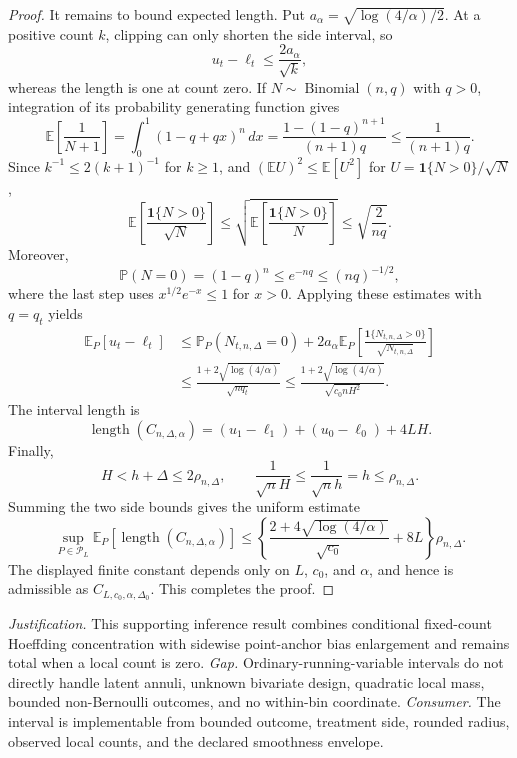 \documentclass{article}
\begin{document}
\begin{proof}
It remains to bound expected length.  Put \(a_\alpha=\sqrt{\log(4/\alpha)/2}\).  At a positive count \(k\), clipping can only shorten the side interval, so
\[
 u_t-\ell_t\leq\frac{2a_\alpha}{\sqrt{k}},
\]
whereas the length is one at count zero.  If \(N\sim\operatorname{Binomial}(n,q)\) with \(q>0\), integration of its probability generating function gives
\[
 \mathbb E\!\left[\frac1{N+1}\right]
 =\int_0^1(1-q+qx)^n\,dx
 =\frac{1-(1-q)^{n+1}}{(n+1)q}
 \leq\frac1{(n+1)q}.
\]
Since \(k^{-1}\leq2(k+1)^{-1}\) for \(k\geq1\), and \((\mathbb E U)^2\leq\mathbb E[U^2]\) for \(U=\mathbf1\{N>0\}/\sqrt N\),
\[
 \mathbb E\!\left[\frac{\mathbf1\{N>0\}}{\sqrt N}\right]
 \leq\sqrt{\mathbb E\!\left[\frac{\mathbf1\{N>0\}}N\right]}
 \leq\sqrt{\frac2{nq}}.
\]
Moreover,
\[
 \mathbb P(N=0)=(1-q)^n\leq e^{-nq}\leq(nq)^{-1/2},
\]
where the last step uses \(x^{1/2}e^{-x}\leq1\) for \(x>0\).  Applying these estimates with \(q=q_t\) yields
\[
 \begin{aligned}
 \mathbb E_P[u_t-\ell_t]
 &\leq \mathbb P_P(N_{t,n,\Delta}=0)
   +2a_\alpha\mathbb E_P\!\left[
      \frac{\mathbf1\{N_{t,n,\Delta}>0\}}{\sqrt{N_{t,n,\Delta}}}
    \right]\\
 &\leq\frac{1+2\sqrt{\log(4/\alpha)}}{\sqrt{nq_t}}
 \leq\frac{1+2\sqrt{\log(4/\alpha)}}{\sqrt{c_0nH^2}}.
 \end{aligned}
\]
The interval length is
\[
 \operatorname{length}(C_{n,\Delta,\alpha})
 =(u_1-\ell_1)+(u_0-\ell_0)+4LH.
\]
Finally,
\[
 H<h+\Delta\leq2\rho_{n,\Delta},
 \qquad
 \frac1{\sqrt nH}\leq\frac1{\sqrt nh}=h\leq\rho_{n,\Delta}.
\]
Summing the two side bounds gives the uniform estimate
\[
 \sup_{P\in\mathcal P_L}\mathbb E_P[\operatorname{length}(C_{n,\Delta,\alpha})]
 \leq
 \left\{
 \frac{2+4\sqrt{\log(4/\alpha)}}{\sqrt{c_0}}+8L
 \right\}\rho_{n,\Delta}.
\]
The displayed finite constant depends only on \(L\), \(c_0\), and \(\alpha\), and hence is admissible as \(C_{L,c_0,\alpha,\Delta_0}\).  This completes the proof.
\end{proof}
\par\smallskip\noindent \textit{Justification.} This supporting inference result combines conditional fixed-count Hoeffding concentration with sidewise point-anchor bias enlargement and remains total when a local count is zero. \textit{Gap.} Ordinary-running-variable intervals do not directly handle latent annuli, unknown bivariate design, quadratic local mass, bounded non-Bernoulli outcomes, and no within-bin coordinate. \textit{Consumer.} The interval is implementable from bounded outcome, treatment side, rounded radius, observed local counts, and the declared smoothness envelope.
\end{document}
